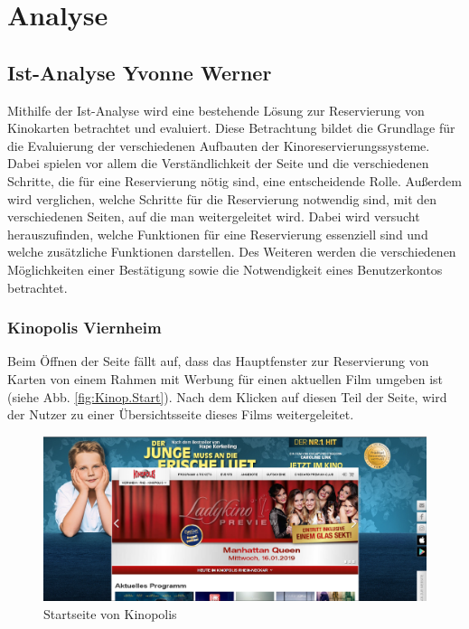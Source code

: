 \chapter{Analyse} \label{analyse}
	
	
	\section[Ist-Analyse]{Ist-Analyse {\hfill \normalsize Yvonne Werner}}
	Mithilfe der Ist-Analyse wird eine bestehende Lösung zur Reservierung von Kinokarten betrachtet und evaluiert. Diese Betrachtung bildet die Grundlage für die Evaluierung der verschiedenen Aufbauten der Kinoreservierungssysteme. Dabei spielen vor allem die Verständlichkeit der Seite und die verschiedenen Schritte, die für eine Reservierung nötig sind, eine entscheidende Rolle. Außerdem wird verglichen, welche Schritte für die Reservierung notwendig sind, mit den verschiedenen Seiten, auf die man weitergeleitet wird. Dabei wird versucht herauszufinden, welche Funktionen für eine Reservierung essenziell sind und welche zusätzliche Funktionen darstellen. Des Weiteren werden die verschiedenen Möglichkeiten einer Bestätigung sowie die Notwendigkeit eines Benutzerkontos betrachtet. 
	
	\subsection{Kinopolis Viernheim}
	Beim Öffnen der Seite fällt auf, dass das Hauptfenster zur Reservierung von Karten von einem Rahmen mit Werbung für einen aktuellen Film umgeben ist (siehe Abb. \vref{fig:Kinop.Start}). Nach dem Klicken auf diesen Teil der Seite, wird der Nutzer zu einer Übersichtsseite dieses Films weitergeleitet. 
	\begin{figure}[H]
		\centering 
		\includegraphics[width=14cm]{img/Kinopolis_MA_Startseite.png}
		\captionsetup{format=hang}
		\centering\caption[Startseite von Kinopolis Viernheim]{\label{fig:Kinop.Start}Startseite von Kinopolis\footnotemark}
	\end{figure} 

